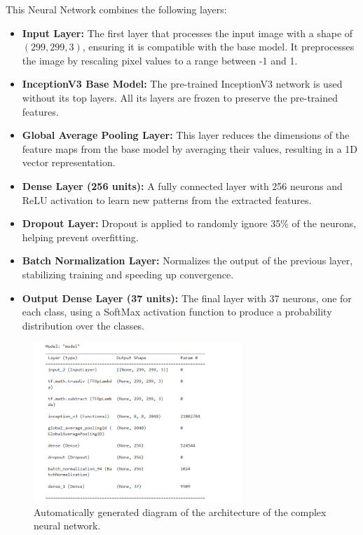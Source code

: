 This Neural Network combines the following layers:
\begin{itemize}
    \item \textbf{Input Layer:} The first layer that processes the input image with a shape of $(299, 299, 3)$, ensuring it is compatible with the base model. It preprocesses the image by rescaling pixel values to a range between -1 and 1.
    
    \item \textbf{InceptionV3 Base Model:} The pre-trained InceptionV3 network is used without its top layers. All its layers are frozen to preserve the pre-trained features.
    
    \item \textbf{Global Average Pooling Layer:} This layer reduces the dimensions of the feature maps from the base model by averaging their values, resulting in a 1D vector representation.
    
    \item \textbf{Dense Layer (256 units):} A fully connected layer with 256 neurons and ReLU activation to learn new patterns from the extracted features.
    
    \item \textbf{Dropout Layer:} Dropout is applied to randomly ignore 35\% of the neurons, helping prevent overfitting.
    
    \item \textbf{Batch Normalization Layer:} Normalizes the output of the previous layer, stabilizing training and speeding up convergence.
    
    \item \textbf{Output Dense Layer (37 units):} The final layer with 37 neurons, one for each class, using a SoftMax activation function to produce a probability distribution over the classes.
\end{itemize}
 \begin{figure}[h]
    \centering
    \includegraphics[width=0.7\textwidth]{figures/complex model architecture.png}
    \caption{Automatically generated diagram of the architecture of the complex neural network.}
    \label{fig:example_images}
\end{figure}

